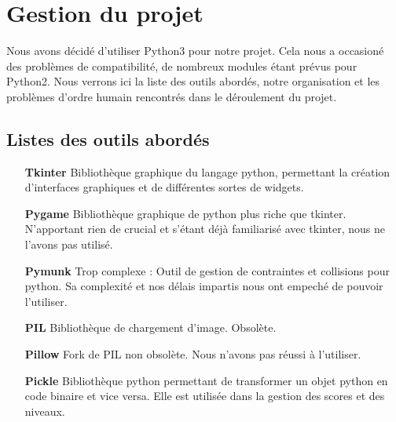 \section{Gestion du projet}
  Nous avons décidé d'utiliser Python3 pour notre projet. Cela nous a occasioné des problèmes de compatibilité, de nombreux modules étant prévus pour Python2. Nous verrons ici la liste des outils abordés, notre organisation et les problèmes d'ordre humain rencontrés dans le déroulement du projet.
  
\subsection{Listes des outils abordés}
  \begin{enumerate}
     \item[\bf Tkinter] Bibliothèque graphique du langage python, permettant la création d'interfaces graphiques et de différentes sortes de widgets.
    \item[\bf Pygame] Bibliothèque graphique de python plus riche que tkinter. N'apportant rien de crucial et s'étant déjà familiarisé avec tkinter, nous ne l'avons pas utilisé.
    \item[\bf Pymunk] Trop complexe : Outil de gestion de contraintes et collisions pour python. Sa complexité et nos délais impartis nous ont empeché de pouvoir l'utiliser.
    \item[\bf PIL] Bibliothèque de chargement d'image. Obsolète.
    \item[\bf Pillow] Fork de PIL non obsolète. Nous n'avons pas réussi à l'utiliser.
    \item[\bf Pickle] Bibliothèque python permettant de transformer un objet python en code binaire et vice versa. Elle est utilisée dans la gestion des scores et des niveaux.
    

\end{enumerate}
